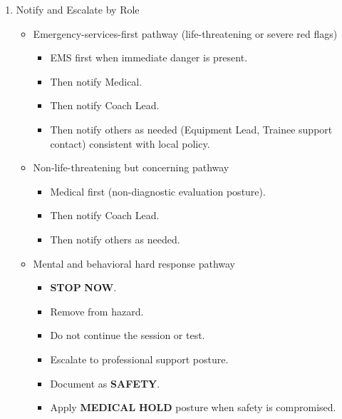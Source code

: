 \documentclass[10pt]{article}
\begin{document}
\begin{enumerate}
\item Notify and Escalate by Role
  \begin{itemize}
  \item Emergency-services-first pathway (life-threatening or severe red flags)
    \begin{itemize}
    \item EMS first when immediate danger is present.
    \item Then notify Medical.
    \item Then notify Coach Lead.
    \item Then notify others as needed (Equipment Lead, Trainee support contact) consistent with local policy.
    \end{itemize}
  \item Non-life-threatening but concerning pathway
    \begin{itemize}
    \item Medical first (non-diagnostic evaluation posture).
    \item Then notify Coach Lead.
    \item Then notify others as needed.
    \end{itemize}
  \item Mental and behavioral hard response pathway
    \begin{itemize}
    \item \textbf{STOP} \textbf{NOW}.
    \item Remove from hazard.
    \item Do not continue the session or test.
    \item Escalate to professional support posture.
    \item Document as \textbf{SAFETY}.
    \item Apply \textbf{MEDICAL} \textbf{HOLD} posture when safety is compromised.
    \end{itemize}
  \end{itemize}


\end{enumerate}
\end{document}
